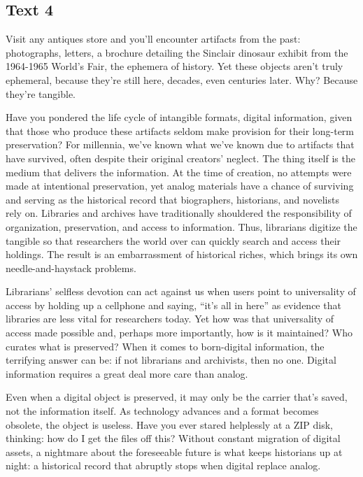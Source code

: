 \documentclass[UTF8,11pt]{ctexart}
\begin{document}
\subsection*{\textbf{Text 4}}


Visit any antiques store and you’ll encounter artifacts from the past: photographs, letters, a brochure detailing the Sinclair dinosaur exhibit from the 1964-1965 World’s Fair, the ephemera of history. Yet these objects aren’t truly ephemeral, because they’re still here, decades, even centuries later. Why? Because they’re tangible.


Have you pondered the life cycle of intangible formats, digital information, given that those who produce these artifacts seldom make provision for their long-term preservation? For millennia, we’ve known what we’ve known due to artifacts that have survived, often despite their original creators’ neglect. The thing itself is the medium that delivers the information. At the time of creation, no attempts were made at intentional preservation, yet analog materials have a chance of surviving and serving as the historical record that biographers, historians, and novelists rely on. Libraries and archives have traditionally shouldered the responsibility of organization, preservation, and access to information. Thus, librarians digitize the tangible so that researchers the world over can quickly search and access their holdings. The result is an embarrassment of historical riches, which brings its own needle-and-haystack problems.


Librarians’ selfless devotion can act against us when users point to universality of access by holding up a cellphone and saying, “it’s all in here” as evidence that libraries are less vital for researchers today. Yet how was that universality of access made possible and, perhaps more importantly, how is it maintained? Who curates what is preserved? When it comes to born-digital information, the terrifying answer can be: if not librarians and archivists, then no one. Digital information requires a great deal more care than analog.


Even when a digital object is preserved, it may only be the carrier that’s saved, not the information itself. As technology advances and a format becomes obsolete, the object is useless. Have you ever stared helplessly at a ZIP disk, thinking: how do I get the files off this? Without constant migration of digital assets, a nightmare about the foreseeable future is what keeps historians up at night: a historical record that abruptly stops when digital replace analog.
\end{document}
